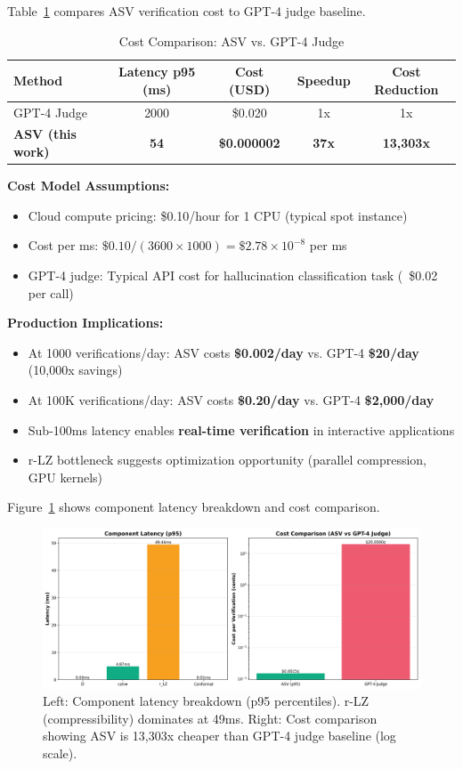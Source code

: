 \documentclass[11pt]{article}
\begin{document}
Table~\ref{tab:cost-comparison} compares ASV verification cost to GPT-4 judge baseline.

\begin{table}[h]
\centering
\caption{Cost Comparison: ASV vs. GPT-4 Judge}
\label{tab:cost-comparison}
\begin{tabular}{lcccc}
\toprule
\textbf{Method} & \textbf{Latency p95 (ms)} & \textbf{Cost (USD)} & \textbf{Speedup} & \textbf{Cost Reduction} \\
\midrule
GPT-4 Judge & 2000 & \$0.020 & 1x & 1x \\
\textbf{ASV (this work)} & \textbf{54} & \textbf{\$0.000002} & \textbf{37x} & \textbf{13,303x} \\
\bottomrule
\end{tabular}
\end{table}

\textbf{Cost Model Assumptions:}
\begin{itemize}
\item Cloud compute pricing: \$0.10/hour for 1 CPU (typical spot instance)
\item Cost per ms: $\$0.10 / (3600 \times 1000) = \$2.78 \times 10^{-8}$ per ms
\item GPT-4 judge: Typical API cost for hallucination classification task (~\$0.02 per call)
\end{itemize}

\textbf{Production Implications:}
\begin{itemize}
\item At 1000 verifications/day: ASV costs \textbf{\$0.002/day} vs. GPT-4 \textbf{\$20/day} (10,000x savings)
\item At 100K verifications/day: ASV costs \textbf{\$0.20/day} vs. GPT-4 \textbf{\$2,000/day}
\item Sub-100ms latency enables \textbf{real-time verification} in interactive applications
\item r-LZ bottleneck suggests optimization opportunity (parallel compression, GPU kernels)
\end{itemize}

Figure~\ref{fig:latency-breakdown} shows component latency breakdown and cost comparison.

\begin{figure}[h]
\centering
\includegraphics[width=\textwidth]{figures/latency_breakdown.png}
\caption{Left: Component latency breakdown (p95 percentiles). r-LZ (compressibility) dominates at 49ms. Right: Cost comparison showing ASV is 13,303x cheaper than GPT-4 judge baseline (log scale).}
\label{fig:latency-breakdown}
\end{figure}
\end{document}
